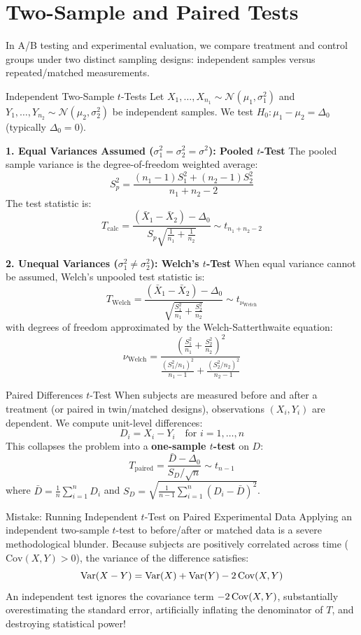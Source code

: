 \section{Two-Sample and Paired Tests}

In A/B testing and experimental evaluation, we compare treatment and control groups under two distinct sampling designs: independent samples versus repeated/matched measurements.

\begin{formulabox}{Independent Two-Sample $t$-Tests}
Let $X_1, \dots, X_{n_1} \sim \mathcal{N}(\mu_1, \sigma_1^2)$ and $Y_1, \dots, Y_{n_2} \sim \mathcal{N}(\mu_2, \sigma_2^2)$ be independent samples. We test $H_0 \colon \mu_1 - \mu_2 = \Delta_0$ (typically $\Delta_0 = 0$).

\textbf{1. Equal Variances Assumed ($\sigma_1^2 = \sigma_2^2 = \sigma^2$): Pooled $t$-Test}
The pooled sample variance is the degree-of-freedom weighted average:
$$S_p^2 = \frac{(n_1 - 1)S_1^2 + (n_2 - 1)S_2^2}{n_1 + n_2 - 2}$$
The test statistic is:
$$T_{\text{calc}} = \frac{(\bar{X}_1 - \bar{X}_2) - \Delta_0}{S_p \sqrt{\frac{1}{n_1} + \frac{1}{n_2}}} \sim t_{n_1 + n_2 - 2}$$

\textbf{2. Unequal Variances ($\sigma_1^2 \neq \sigma_2^2$): Welch's $t$-Test}
When equal variance cannot be assumed, Welch's unpooled test statistic is:
$$T_{\text{Welch}} = \frac{(\bar{X}_1 - \bar{X}_2) - \Delta_0}{\sqrt{\frac{S_1^2}{n_1} + \frac{S_2^2}{n_2}}} \sim t_{\nu_{\text{Welch}}}$$
with degrees of freedom approximated by the Welch-Satterthwaite equation:
$$\nu_{\text{Welch}} = \frac{\left(\frac{S_1^2}{n_1} + \frac{S_2^2}{n_2}\right)^2}{\frac{(S_1^2 / n_1)^2}{n_1 - 1} + \frac{(S_2^2 / n_2)^2}{n_2 - 1}}$$
\end{formulabox}

\begin{formulabox}{Paired Differences $t$-Test}
When subjects are measured before and after a treatment (or paired in twin/matched designs), observations $(X_i, Y_i)$ are dependent. We compute unit-level differences:
$$D_i = X_i - Y_i \quad \text{for } i = 1, \dots, n$$
This collapses the problem into a \textbf{one-sample $t$-test} on $D$:
$$T_{\text{paired}} = \frac{\bar{D} - \Delta_0}{S_D / \sqrt{n}} \sim t_{n-1}$$
where $\bar{D} = \frac{1}{n}\sum_{i=1}^n D_i$ and $S_D = \sqrt{\frac{1}{n-1}\sum_{i=1}^n (D_i - \bar{D})^2}$.
\end{formulabox}

\begin{trapbox}{Mistake: Running Independent $t$-Test on Paired Experimental Data}
Applying an independent two-sample $t$-test to before/after or matched data is a severe methodological blunder. Because subjects are positively correlated across time ($\text{Cov}(X, Y) > 0$), the variance of the difference satisfies:
$$\operatorname{Var}(X - Y) = \operatorname{Var}(X) + \operatorname{Var}(Y) - 2\operatorname{Cov}(X, Y)$$
An independent test ignores the covariance term $-2\operatorname{Cov}(X, Y)$, substantially overestimating the standard error, artificially inflating the denominator of $T$, and destroying statistical power!
\end{trapbox}


